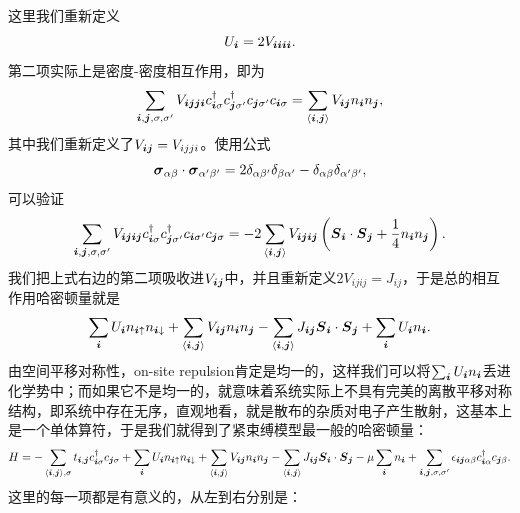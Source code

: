 这里我们重新定义
\begin{equation}
    U_{\vb*{i}} = 2 V_{\vb*{i} \vb*{i} \vb*{i} \vb*{i}}.
\end{equation}
第二项实际上是密度-密度相互作用，即为
\[
    \sum_{\vb*{i}, \vb*{j}, \sigma, \sigma'} V_{\vb*{i} \vb*{j} \vb*{j} \vb*{i}} c^\dagger_{\vb*{i} \sigma} c^\dagger_{\vb*{j} \sigma'} c_{\vb*{j} \sigma'} c_{\vb*{i} \sigma} = \sum_{\langle \vb*{i}, \vb*{j} \rangle} V_{\vb*{i} \vb*{j}}n_{\vb*{i}} n_{\vb*{j}},
\]
其中我们重新定义了$V_{\vb*{i} \vb*{j}} = V_{ijji}$。使用公式
\[
    \vb*{\sigma}_{\alpha \beta} \cdot \vb*{\sigma}_{\alpha' \beta'} = 2 \delta_{\alpha \beta'} \delta_{\beta \alpha'} - \delta_{\alpha \beta} \delta_{\alpha' \beta'},
\]
可以验证
\[
    \sum_{\vb*{i}, \vb*{j}, \sigma, \sigma'} V_{\vb*{i} \vb*{j} \vb*{i} \vb*{j}} c^\dagger_{\vb*{i} \sigma} c^\dagger_{\vb*{j} \sigma'} c_{\vb*{i} \sigma'} c_{\vb*{j} \sigma} = - 2 \sum_{\langle \vb*{i}, \vb*{j} \rangle} V_{\vb*{i} \vb*{j} \vb*{i} \vb*{j}} \left( \vb*{S}_{\vb*{i}} \cdot \vb*{S}_{\vb*{j}} + \frac{1}{4}n_{\vb*{i}} n_{\vb*{j}} \right).
\]
我们把上式右边的第二项吸收进$V_{\vb*{i} \vb*{j}}$中，并且重新定义$2V_{ijij}=J_{ij}$，于是总的相互作用哈密顿量就是
\[
    \sum_{\vb*{i}} U_{\vb*{i}} n_{\vb*{i} \uparrow} n_{\vb*{i} \downarrow} + \sum_{\langle \vb*{i}, \vb*{j} \rangle} V_{\vb*{i} \vb*{j}}n_{\vb*{i}} n_{\vb*{j}} - \sum_{\langle \vb*{i}, \vb*{j} \rangle} J_{\vb*{i} \vb*{j}} \vb*{S}_{\vb*{i}} \cdot \vb*{S}_{\vb*{j}} + \sum_{\vb*{i}} U_{\vb*{i}}n_{\vb*{i}}.
\]
由空间平移对称性，on-site repulsion肯定是均一的，这样我们可以将$\sum_{\vb*{i}} U_{\vb*{i}}n_{\vb*{i}}$丢进化学势中；而如果它不是均一的，就意味着系统实际上不具有完美的离散平移对称结构，即系统中存在无序，直观地看，就是散布的杂质对电子产生散射，这基本上是一个单体算符，于是我们就得到了紧束缚模型最一般的哈密顿量：
\begin{equation}
    H = - \sum_{\langle \vb*{i}, \vb*{j} \rangle, \sigma} t_{\vb*{i}, \vb*{j}} c^\dagger_{\vb*{i} \sigma} c_{\vb*{j} \sigma} 
    + \sum_{\vb*{i}} U_{\vb*{i}} n_{\vb*{i} \uparrow} n_{\vb*{i} \downarrow} 
    + \sum_{\langle \vb*{i}, \vb*{j} \rangle} V_{\vb*{i} \vb*{j}} n_{\vb*{i}} n_{\vb*{j}} - \sum_{\langle \vb*{i}, \vb*{j} \rangle} J_{\vb*{i} \vb*{j}} \vb*{S}_{\vb*{i}} \cdot \vb*{S}_{\vb*{j}} 
    - \mu \sum_{\vb*{i}} n_{\vb*{i}} + \sum_{\vb*{i}, \vb*{j}, \sigma, \sigma'} \epsilon_{\vb*{i} \vb*{j} \alpha \beta} c^\dagger_{\vb*{i} \alpha} c_{\vb*{j} \beta}.  
\end{equation}
这里的每一项都是有意义的，从左到右分别是：
